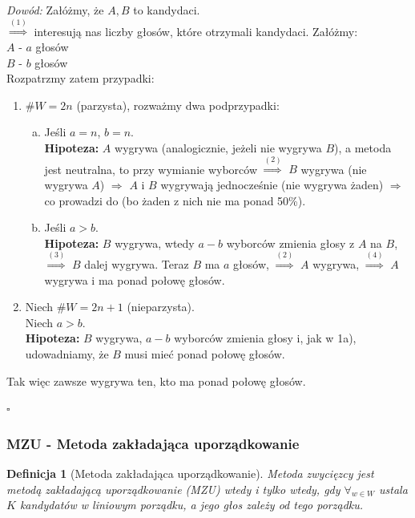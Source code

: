 \documentclass[12pt,a4paper]{article}
\theoremstyle{break}
\newtheorem{definition}{Definicja}[section]
\begin{document}
	\textit{Dowód:}
	Załóżmy, że $A,B$ to kandydaci.\\
	$\overset{(1)}{\Rightarrow}$ interesują nas liczby głosów, które otrzymali kandydaci. Załóżmy:\\
	$A$ - $a$ głosów\\
	$B$ - $b$ głosów\\
	Rozpatrzmy zatem przypadki:\\
	\begin{enumerate}[1$^\circ$]
		\item $\# W = 2n$ (parzysta), rozważmy dwa podprzypadki:
		\begin{enumerate}[a)]
			\item Jeśli $a=n$, $b=n$.\\
			\textbf{Hipoteza:} $A$ wygrywa (analogicznie, jeżeli nie wygrywa $B$), a metoda jest neutralna, to przy wymianie wyborców $\overset{(2)}{\Rightarrow}$ $B$ wygrywa (nie wygrywa $A$) $\Rightarrow$ $A$ i $B$ wygrywają jednocześnie (nie wygrywa żaden) $\Rightarrow$ co prowadzi do \faBolt (bo żaden z nich nie ma ponad 50\%).
			
			\item Jeśli $a>b$.\\
			\textbf{Hipoteza:} $B$ wygrywa, wtedy $a-b$ wyborców zmienia głosy z $A$ na $B$, $\overset{(3)}{\Rightarrow}$ $B$ dalej wygrywa. Teraz $B$ ma $a$ głosów, $\overset{(2)}{\Rightarrow}$ $A$ wygrywa, $\overset{(4)}{\Rightarrow}$ $A$ wygrywa i ma ponad połowę głosów.
		\end{enumerate}
		
		\item Niech $\# W = 2n+1$ (nieparzysta).\\
		Niech $a>b$.\\
		\textbf{Hipoteza:} $B$ wygrywa, $a-b$ wyborców zmienia głosy i, jak w 1a), udowadniamy, że $B$ musi mieć ponad połowę głosów.
	\end{enumerate}
	
	Tak więc zawsze wygrywa ten, kto ma ponad połowę głosów.
	\begin{flushright}$\square$\end{flushright}
	\subsubsection{MZU - Metoda zakładająca uporządkowanie}
	\begin{definition}[Metoda zakładająca uporządkowanie]
		Metoda zwycięzcy jest metodą zakładającą uporządkowanie (MZU) \textit{wtedy i tylko wtedy}, gdy $\forall_{w\in W}$ ustala $K$ kandydatów w liniowym porządku, a jego głos zależy od tego porządku.
	\end{definition}
	
\end{document}
